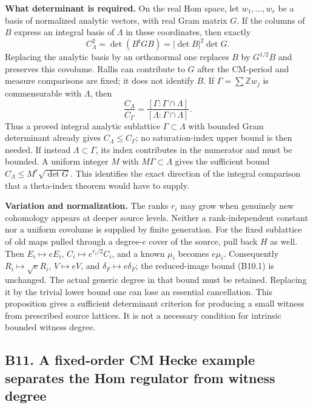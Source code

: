 \textbf{What determinant is required.} On the real Hom space, let \(w_1,\ldots,w_r\) be a basis of normalized analytic vectors, with real Gram matrix \(G\). If the columns of \(B\) express an integral basis of \(\Lambda\) in these coordinates, then exactly \[
 C_\Lambda^2=\det(B^{\mathsf t}GB)=|\det B|^2\det G.
\tag{B10.3}
\] Replacing the analytic basis by an orthonormal one replaces \(B\) by \(G^{1/2}B\) and preserves this covolume. Rallis can contribute to \(G\) after the CM-period and measure comparisons are fixed; it does not identify \(B\). If \(\Gamma=\sum\mathbb Zw_j\) is commensurable with \(\Lambda\), then \[
 \frac{C_\Lambda}{C_\Gamma}
 =\frac{[\Gamma:\Gamma\cap\Lambda]}{[\Lambda:\Gamma\cap\Lambda]}.
\] Thus a proved integral analytic sublattice \(\Gamma\subset\Lambda\) with bounded Gram determinant already gives \(C_\Lambda\le C_\Gamma\); no saturation-index upper bound is then needed. If instead \(\Lambda\subset\Gamma\), its index contributes in the numerator and must be bounded. A uniform integer \(M\) with \(M\Gamma\subset\Lambda\) gives the sufficient bound \(C_\Lambda\le M^r\sqrt{\det G}\). This identifies the exact direction of the integral comparison that a theta-index theorem would have to supply.

\textbf{Variation and normalization.} The ranks \(r_i\) may grow when genuinely new cohomology appears at deeper source levels. Neither a rank-independent constant nor a uniform covolume is supplied by finite generation. For the fixed sublattice of old maps pulled through a degree-\(e\) cover of the source, pull back \(H\) as well. Then \(E_i\mapsto eE_i\), \(C_i\mapsto e^{r_i/2}C_i\), and a known \(\mu_i\) becomes \(e\mu_i\). Consequently \(R_i\mapsto\sqrt e R_i\), \(V\mapsto eV\), and \(\delta_F\mapsto e\delta_F\); the reduced-image bound (B10.1) is unchanged. The actual generic degree in that bound must be retained. Replacing it by the trivial lower bound one can lose an essential cancellation. This proposition gives a sufficient determinant criterion for producing a small witness from prescribed source lattices. It is not a necessary condition for intrinsic bounded witness degree.

\subsection{B11. A fixed-order CM Hecke example separates the Hom regulator from witness degree}\label{b11.-a-fixed-order-cm-hecke-example-separates-the-hom-regulator-from-witness-degree}

